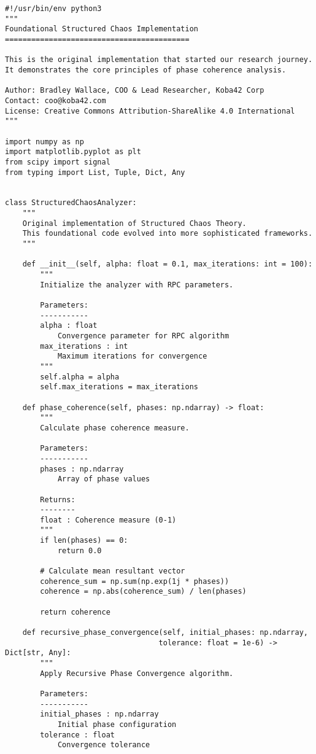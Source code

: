 \documentclass[12pt]{article}
\begin{document}
\begin{lstlisting}
#!/usr/bin/env python3
"""
Foundational Structured Chaos Implementation
==========================================

This is the original implementation that started our research journey.
It demonstrates the core principles of phase coherence analysis.

Author: Bradley Wallace, COO & Lead Researcher, Koba42 Corp
Contact: coo@koba42.com
License: Creative Commons Attribution-ShareAlike 4.0 International
"""

import numpy as np
import matplotlib.pyplot as plt
from scipy import signal
from typing import List, Tuple, Dict, Any


class StructuredChaosAnalyzer:
    """
    Original implementation of Structured Chaos Theory.
    This foundational code evolved into more sophisticated frameworks.
    """

    def __init__(self, alpha: float = 0.1, max_iterations: int = 100):
        """
        Initialize the analyzer with RPC parameters.

        Parameters:
        -----------
        alpha : float
            Convergence parameter for RPC algorithm
        max_iterations : int
            Maximum iterations for convergence
        """
        self.alpha = alpha
        self.max_iterations = max_iterations

    def phase_coherence(self, phases: np.ndarray) -> float:
        """
        Calculate phase coherence measure.

        Parameters:
        -----------
        phases : np.ndarray
            Array of phase values

        Returns:
        --------
        float : Coherence measure (0-1)
        """
        if len(phases) == 0:
            return 0.0

        # Calculate mean resultant vector
        coherence_sum = np.sum(np.exp(1j * phases))
        coherence = np.abs(coherence_sum) / len(phases)

        return coherence

    def recursive_phase_convergence(self, initial_phases: np.ndarray,
                                   tolerance: float = 1e-6) -> Dict[str, Any]:
        """
        Apply Recursive Phase Convergence algorithm.

        Parameters:
        -----------
        initial_phases : np.ndarray
            Initial phase configuration
        tolerance : float
            Convergence tolerance


\end{lstlisting}
\end{document}
